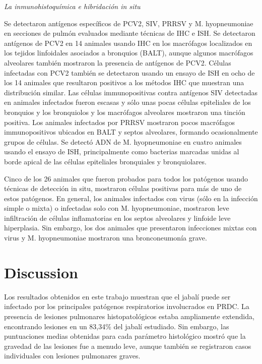 \documentclass[12pt,a4paper,Spanish]{book}
\begin{document}
\textit{La inmunohistoquímica e hibridación in situ}

Se detectaron antígenos específicos de PCV2, SIV, PRRSV y M. hyopneumoniae en secciones de pulmón evaluados mediante técnicas de IHC e ISH. Se detectaron antígenos de PCV2 en 14 animales usando IHC en los macrófagos localizados en los tejidos linfoidales asociados a bronquios (BALT), aunque algunos macrófagos alveolares también mostraron la presencia de antígenos de PCV2. Células infectadas con PCV2 también se detectaron usando un ensayo de ISH en ocho de los 14 animales que resultaron positivos a los métodos IHC que muestran una distribución similar. Las células immunopositivas contra antígenos SIV detectadas en animales infectados fueron escasas y sólo unas pocas células epiteliales de los bronquios y los bronquiolos y los macrófagos alveolares mostraron una tinción positiva. Los animales infectados por PRRSV mostraron pocos macrófagos immunopositivos ubicados en BALT y septos alveolares, formando ocasionalmente grupos de células. Se detectó ADN de M. hyopneumoniae en cuatro animales usando el ensayo de ISH, principalmente como bacterias marcadas unidas al borde apical de las células epiteliales bronquiales y bronquiolares.

Cinco de los 26 animales que fueron probados para todos los patógenos usando técnicas de detección in situ, mostraron células positivas para más de uno de estos patógenos. En general, los animales infectados con virus (sólo en la infección simple o mixta) o infectadas solo con M. hyopneumoniae, mostraron leve infiltración de células inflamatorias en los septos alveolares y linfoide leve hiperplasia. Sin embargo, los dos animales que presentaron infecciones mixtas con virus y M. hyopneumoniae mostraron una bronconeumonía grave.

\chapter{Discussion}

Los resultados obtenidos en este trabajo muestran que el jabalí puede ser infectado por los principales patógenos respiratorios involucrados en PRDC. La presencia de lesiones pulmonares histopatológicos estaba ampliamente extendida, encontrando lesiones en un 83,34\% del jabalí estudiado. Sin embargo, las puntuaciones medias obtenidas para cada parámetro histológico mostró que la gravedad de las lesiones fue a menudo leve, aunque también se registraron casos individuales con lesiones pulmonares graves.
\end{document}
